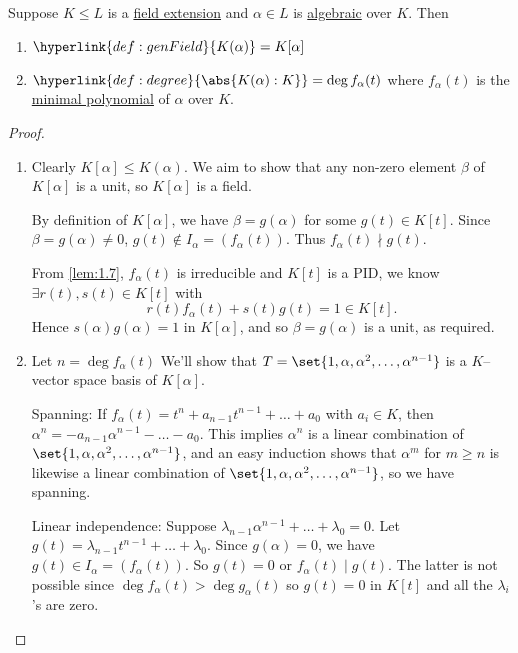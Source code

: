 \documentclass{article}
\begin{document}

\begin{nthm}\label{thm:1.9}
    Suppose $K \leq L$ is a \hyperlink{def:fieldExt}{field extension} and $\alpha \in L$ is \hyperlink{def:algebraic}{algebraic} over $K$.  Then
    \begin{enumerate}[label=(\roman*)]
        \item  $\hyperlink{def:genField}{K(\alpha)} = K[\alpha]$
        \item $\hyperlink{def:degree}{\abs{K(\alpha) : K}} = \deg f_\alpha(t)$ where $f_\alpha(t)$ is the \hyperlink{def:minimalPoly}{minimal polynomial} of $\alpha$ over $K$.
    \end{enumerate}
\end{nthm}

\begin{proof}\leavevmode
    \begin{enumerate}[label=(\roman*)]
        \item Clearly $K[\alpha] \leq K(\alpha)$. We aim to show that any non-zero element $\beta$ of $K[\alpha]$ is a unit, so $K[\alpha]$ is a field.

            By definition of $K[\alpha]$, we have $\beta = g(\alpha)$ for some $g(t) \in K[t]$.
            Since $\beta = g(\alpha) \neq 0$, $g(t) \notin I_\alpha = (f_\alpha(t))$.
            Thus $f_\alpha(t) \nmid g(t)$.

            From \cref{lem:1.7}, $f_\alpha(t)$ is irreducible and $K[t]$ is a PID, we know $\exists r(t), s(t) \in K[t]$ with
            \begin{equation*}r(t) f_\alpha(t) + s(t) g(t) = 1 \in K[t].\end{equation*}
            Hence $s(\alpha) g(\alpha) = 1$ in $K[\alpha]$, and so $\beta = g(\alpha)$ is a unit, as required.
        \item Let $n = \deg f_\alpha(t)$ We'll show that $T = \set{1, \alpha, \alpha^2, \dotsc, \alpha^{n-1}}$ is a $K$--vector space basis of $K[\alpha]$.

            Spanning: If $f_\alpha(t) = t^n + a_{n-1} t^{n-1} + \dots + a_0$ with $a_i \in K$, then $\alpha^n = -a_{n-1} \alpha^{n-1} - \dots - a_0$.
            This implies $\alpha^n$ is a linear combination of $\set{1, \alpha, \alpha^2, \dotsc, \alpha^{n-1}}$, and an easy induction shows that $\alpha^m$ for $m \geq n$ is likewise a linear combination of $\set{1, \alpha, \alpha^2, \dotsc, \alpha^{n-1}}$, so we have spanning.

            Linear independence: Suppose $\lambda_{n-1} \alpha^{n-1} + \dotsc + \lambda_0 = 0$.
            Let $g(t) = \lambda_{n-1} t^{n-1} + \dotsc + \lambda_0$.  Since $g(\alpha) = 0$, we have $g(t) \in I_\alpha = (f_\alpha(t)).$  So $g(t) = 0$ or $f_\alpha(t) \mid g(t)$.
            The latter is not possible since $\deg f_\alpha(t) > \deg g_\alpha(t)$ so $g(t) = 0$ in $K[t]$ and all the $\lambda_i$'s are zero. \qedhere
    \end{enumerate}
\end{proof}
\end{document}
